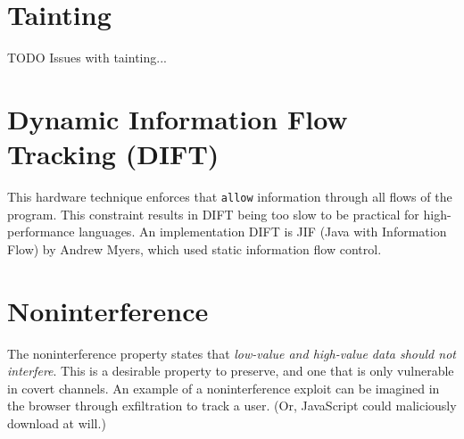 \documentclass[twoside]{article}
\begin{document}
\section{Tainting}

TODO Issues with tainting...

\section{Dynamic Information Flow Tracking (DIFT)}

This hardware technique enforces that \texttt{allow} information through all flows of the program. This constraint results in \textsc{DIFT} being too slow to be practical for high-performance languages.
An implementation \textsc{DIFT} is \textsc{JIF} (Java with Information Flow) by Andrew Myers, which used static information flow control.

\section{Noninterference}

The noninterference property states that \textit{low-value and high-value data should not interfere}.
This is a desirable property to preserve, and one that is only vulnerable in covert channels. An example of a noninterference exploit can be imagined in the browser through exfiltration to track a user. (Or, JavaScript could maliciously download at will.) 
\end{document}
